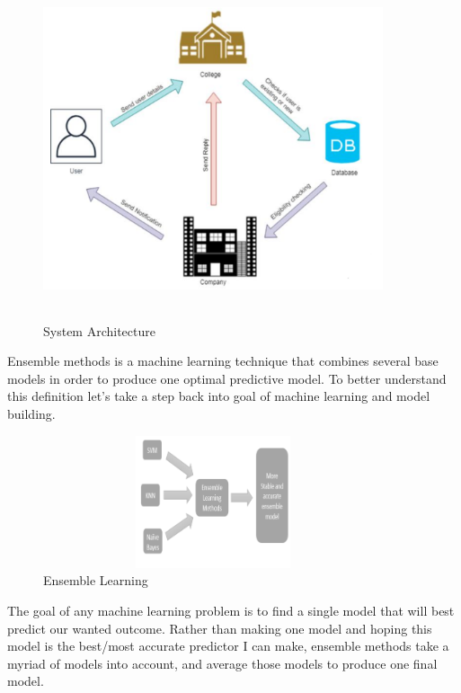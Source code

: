 \documentclass[12pt]{article}
\begin{document}
\begin{figure}[H]
\begin{center}
 \includegraphics[width=10cm, height=10cm]{L1P1}
\caption{System Architecture}
\end{center}
\end{figure}

Ensemble methods is a machine learning 
technique that combines several base models in order to 
produce one optimal predictive model. To better understand 
this definition let’s take a step back into goal of machine 
learning and model building.

\begin{figure}[H]
\begin{center}
 \includegraphics[width=10cm, height=3.9cm]{L1P2}
\caption{Ensemble Learning}
\end{center}
\end{figure}

The goal of any machine learning problem is to find a 
single model that will best predict our wanted outcome. Rather 
than making one model and hoping this model is the best/most 
accurate predictor I can make, ensemble methods take a 
myriad of models into account, and average those models to 
produce one final model.
\end{document}

